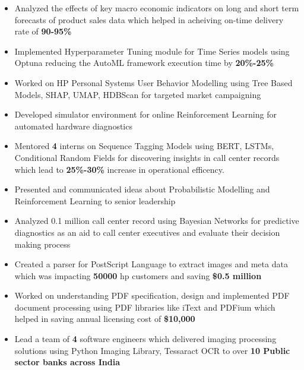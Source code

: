 \documentclass[10pt,a4paper,ragged2e,withhyper]{altacv}
\begin{document}
\begin{paracol}{1}
\par\divider
{}

\begin{itemize}
\item Analyzed the effects of key macro economic indicators on long and short
term forecasts of product sales data which helped in acheiving on-time
delivery rate of \textbf{\textbf{90-95\%}}
\item Implemented Hyperparameter Tuning module for Time Series models using Optuna
reducing the AutoML framework execution time by \textbf{\textbf{20\%-25\%}}
\item Worked on HP Personal Systems User Behavior Modelling using Tree Based Models,
SHAP, UMAP, HDBScan for targeted market campaigning
\item Developed simulator environment for online Reinforcement Learning for
automated hardware diagnostics
\item Mentored \textbf{\textbf{4}} interns on Sequence Tagging Models using BERT, LSTMs,
Conditional Random Fields for discovering insights in call center records
which lead to \textbf{\textbf{25\%-30\%}} increase in operational efficency.
\item Presented and communicated ideas about Probabilistic Modelling and
Reinforcement Learning to senior leadership
\item Analyzed 0.1 million call center record using Bayesian Networks for predictive
diagnostics as an aid to call center executives and evaluate their decision
making process
\end{itemize}


\par\divider
{}
\begin{itemize}
\item Created a parser for PostScript Language to extract images and
meta data which was impacting \textbf{\textbf{50000}} hp customers and saving \textbf{\textbf{\$0.5 million}}
\item Worked on understanding PDF specification, design and implemented PDF document
processing using PDF libraries like iText and PDFium which helped in saving
annual licensing cost of \textbf{\textbf{\$10,000}}
\item Lead a team of \textbf{\textbf{4}} software engineers which delivered imaging processing solutions using
Python Imaging Library, Tessaract OCR to over \textbf{\textbf{10 Public sector banks across India}}
\end{itemize}


\end{paracol}
\end{document}
